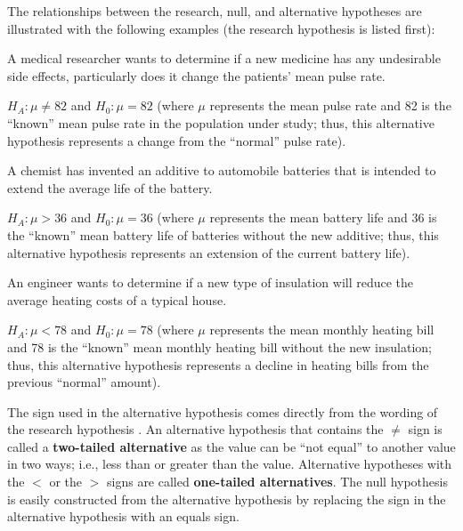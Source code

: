 \documentclass[10pt,openany]{book}\usepackage[]{graphicx}\usepackage[]{color}
\begin{document}
\vspace{-12pt}

The relationships between the research, null, and alternative hypotheses are illustrated with the following examples (the research hypothesis is listed first):

\begin{Enumerate}
  \item A medical researcher wants to determine if a new medicine has any undesirable side effects, particularly does it change the patients' mean pulse rate.
  \begin{Itemize}
    \item $H_{A}:\mu\neq82$ and $H_{0}:\mu=82$ (where $\mu$ represents the mean pulse rate and 82 is the ``known'' mean pulse rate in the population under study; thus, this alternative hypothesis represents a change from the ``normal'' pulse rate).
  \end{Itemize}
   \item A chemist has invented an additive to automobile batteries that is intended to extend the average life of the battery.
  \begin{Itemize}
    \item $H_{A}:\mu>36$ and $H_{0}:\mu=36$ (where $\mu$ represents the mean battery life and 36 is the ``known'' mean battery life of batteries without the new additive; thus, this alternative hypothesis represents an extension of the current battery life).
  \end{Itemize}
  \item An engineer wants to determine if a new type of insulation will reduce the average heating costs of a typical house.
   \begin{Itemize}
    \item $H_{A}:\mu<78$ and $H_{0}:\mu=78$ (where $\mu$ represents the mean monthly heating bill and 78 is the ``known'' mean monthly heating bill without the new insulation; thus, this alternative hypothesis represents a decline in heating bills from the previous ``normal'' amount).
  \end{Itemize}
\end{Enumerate}


The sign used in the alternative hypothesis comes directly from the wording of the research hypothesis .  An alternative hypothesis that contains the $\neq$ sign is called a \textbf{two-tailed alternative} as the value can be ``not equal'' to another value in two ways; i.e., less than or greater than the value.  Alternative hypotheses with the $<$ or the $>$ signs are called \textbf{one-tailed alternatives}.  The null hypothesis is easily constructed from the alternative hypothesis by replacing the sign in the alternative hypothesis with an equals sign.
\end{document}
